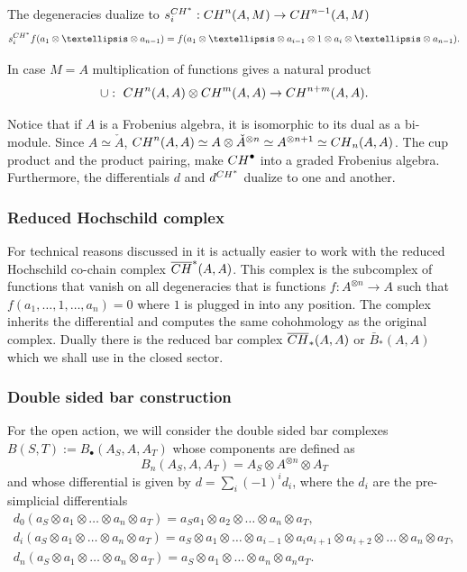 \documentclass[11pt]{article}
\def\oto{\otimes \dots \otimes}
\newcommand{\aoa}[2]{a_{#1}\otimes \dots \otimes a_{#2}}
\def\d{d^{{\rm CH}^*}}
\def\s{s^{{\rm CH}^*}}
\begin{document}
The degeneracies dualize to $\s_i:{\rm CH}^n(A,M)\to {\rm CH}^{n-1}(A,M)$
\begin{equation*}
\s_i f(a_1 \oto a_{n-1})=f(\aoa{1}{i-1}\otimes 1\otimes
\aoa{i}{n-1}).
\end{equation*}


In case $M=A$ multiplication of functions gives a natural product
\[
\cup: \ {\rm CH}^n(A,A)\otimes {\rm CH}^m(A,A)\to {\rm CH}^{n+m}(A,A).
\]


Notice that if $A$ is a Frobenius algebra, it is isomorphic to its
dual as a bi-module. Since $A\simeq {\check A}$, ${\rm CH}^n(A,A)\simeq
A\otimes {\check A}^{\otimes n}\simeq A^{\otimes n+1}\simeq
{\rm CH}_n(A,A)$. The cup product  and the product pairing, make
${\rm CH}^{\bullet}$ into a graded Frobenius algebra. Furthermore, the
dif\/ferentials  $d$ and $\d$ dualize to one and another.

\subsubsection{Reduced Hochschild complex}

For technical reasons discussed in \cite{hoch2} it is actually
easier to work with the reduced Hochschild co-chain complex
$\overline{\rm CH}^*(A,A)$. This complex is the subcomplex of functions
that vanish on all degeneracies that is functions $f:A^{\otimes
n}\to A$ such that $f(a_1,\dots,1,\dots, a_n)=0$ where $1$ is
plugged in into any position. The complex inherits the dif\/ferential
and computes the same cohohmology as the original complex. Dually
there is the reduced bar complex $\overline {\rm CH}_*(A,A)$ or $\bar
B_*(A,A)$ which we shall use in the closed sector.


\subsubsection{Double sided bar construction}
For the open action,
we will consider the double sided bar complexes
$B(S,T):=B_{\bullet}(A_S,A,A_T)$
whose components are def\/ined as
\[
B_n(A_S,A,A_T)=A_S\otimes A^{\otimes n}\otimes A_T
\]
and whose dif\/ferential is given by $d=\sum_i (-1)^i d_i$, where the
$d_i$ are the pre-simplicial dif\/ferentials
\begin{gather*}
d_0 (a_S\otimes a_1 \oto a_n \otimes a_T) = a_Sa_1\otimes \aoa{2}{n}\otimes a_T,\\
d_i (a_S\otimes a_1 \oto a_n \otimes a_T) = a_S\otimes
\aoa{1}{i-1}\otimes a_{i}a_{i+1}\otimes
\aoa{i+2}{n} \otimes a_T,\\
d_{n} (a_S\otimes a_1 \oto a_n \otimes
a_T) = a_S\otimes\aoa{1}{n}\otimes a_n a_T.
\end{gather*}
\end{document}
